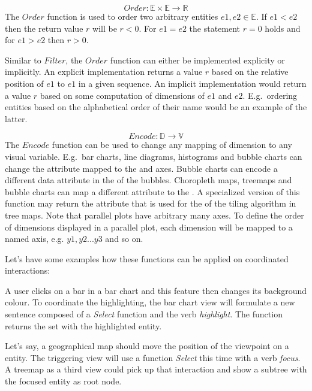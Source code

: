 \begin{equation} Order: \mathbb{E} \times \mathbb{E} \rightarrow \mathbb{R} \end{equation}
  The $Order$ function is used to order two arbitrary entities $e1, e2 \in \mathbb{E}$.
  If $e1 < e2$ then the return value $r$ will be $ r < 0 $.
  For $e1 = e2$ the statement $r = 0$ holds and for $e1 > e2$ then $r > 0$.

  Similar to $Filter$, the $Order$ function can either be implemented explicity or implicitly.
  An explicit implementation returns a value $r$ based on the relative position of $e1$ to $e1$ in a given sequence.
  An implicit implementation would return a value $r$ based on some computation of dimensions of $e1$ and $e2$.
  E.g.\ ordering entities based on the alphabetical order of their name would be an example of the latter.

\begin{equation} Encode: \mathbb{D} \rightarrow \mathbb{V} \end{equation}
  The $Encode$ function can be used to change any mapping of dimension to any visual variable.
  E.g.\ bar charts, line diagrams, histograms and bubble charts can change the attribute mapped to the  and  axes.
  Bubble charts can encode a different data attribute in the  of the bubbles.
  Choropleth maps, treemaps and bubble charts can map a different attribute to the .
  A specialized version of this function may return the attribute that is used for the  of the tiling algorithm in tree maps.
  Note that parallel plots have arbitrary many  axes.
  To define the order of dimensions displayed in a parallel plot, each dimension will be mapped to a named  axis, e.g. $y1, y2 ... y3$ and so on.

Let's have some examples how these functions can be applied on coordinated interactions:

A user clicks on a bar in a bar chart and this feature then changes its background colour.
To coordinate the highlighting, the bar chart view will formulate a new sentence composed of a \emph{Select} function and the verb \emph{highlight}.
The function returns the set with the highlighted entity.

Let's say, a geographical map should move the position of the viewpoint on a entity.
The triggering view will use a function \emph{Select} this time with a verb \emph{focus}.
A treemap as a third view could pick up that interaction and show a subtree with the focused entity as root node. 

